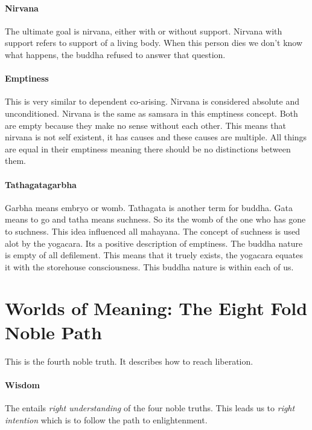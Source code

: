 \documentclass{article}
\begin{document}
\paragraph{Nirvana}
\label{par:nirvana}
The ultimate goal is nirvana, either with or without support. Nirvana with support refers to support of a living body. When this person dies we don't know what happens, the buddha refused to answer that question.

\paragraph{Emptiness}
\label{par:emptiness}
This is very similar to dependent co-arising. Nirvana is considered absolute and unconditioned. Nirvana is the same as samsara in this emptiness concept. Both are empty because they make no sense without each other. This means that nirvana is not self existent, it has causes and these causes are multiple. All things are equal in their emptiness meaning there should be no distinctions between them.

\paragraph{Tathagatagarbha}
\label{par:tathagatagarbha}
Garbha means embryo or womb. Tathagata is another term for buddha. Gata means to go and tatha means suchness. So its the womb of the one who has gone to suchness. This idea influenced all mahayana. The concept of suchness is used alot by the yogacara. Its a positive description of emptiness. The buddha nature is empty of all defilement. This means that it truely exists, the yogacara equates it with the storehouse consciousness. This buddha nature is within each of us.

\section*{Worlds of Meaning: The Eight Fold Noble Path}
\label{sec:worlds_of_meaning_the_eight_fold_noble_path}
This is the fourth noble truth. It describes how to reach liberation.

\paragraph{Wisdom}
\label{par:wisdom}
The entails \emph{right understanding} of the four noble truths. This leads us to \emph{right intention} which is to follow the path to enlightenment.
\end{document}
